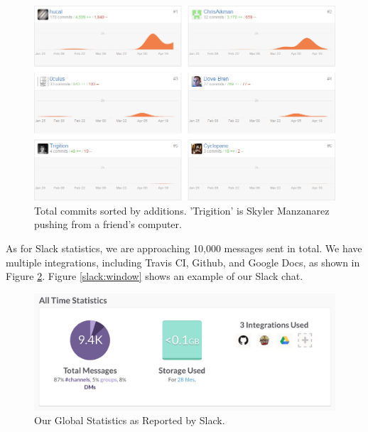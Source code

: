 \documentclass[12pt]{article}
\begin{document}
\begin{figure}[H]
        \centering
        \includegraphics[width=4.5in]{CommitStats.png}
        \caption{Total commits sorted by additions. 'Trigition' is Skyler Manzanarez pushing from a friend's computer.}\label{code:commitstats}
\end{figure}

As for Slack statistics, we are approaching 10,000 messages sent in total. We have multiple integrations, including Travis CI, Github, and Google Docs, as shown in Figure \ref{slack:stats}. Figure \ref{slack:window} shows an example of our Slack chat.

\begin{figure}[H]
        \centering
        \includegraphics[width=4.5in]{slack.png}
        \caption{Our Global Statistics as Reported by Slack.}\label{slack:stats}
\end{figure}
\end{document}
